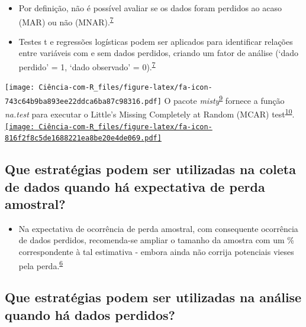 \documentclass[
]{book}
\providecommand{\tightlist}{%
  \setlength{\itemsep}{0pt}\setlength{\parskip}{0pt}}
\begin{document}
\begin{itemize}
\item
  Por definição, não é possível avaliar se os dados foram perdidos ao acaso (MAR) ou não (MNAR).\textsuperscript{\protect\hyperlink{ref-Heymans2022}{7}}
\item
  Testes t e regressões logísticas podem ser aplicados para identificar relações entre variáveis com e sem dados perdidos, criando um fator de análise (`dado perdido' = 1, `dado observado' = 0).\textsuperscript{\protect\hyperlink{ref-Heymans2022}{7}}
\end{itemize}

\texttt{[image: Ciência-com-R\_files/figure-latex/fa-icon-743c64b9ba893ee22ddca6ba87c98316.pdf]} O pacote \emph{misty}\textsuperscript{\protect\hyperlink{ref-misty}{9}} fornece a função \emph{na.test} para executar o Little's Missing Completely at Random (MCAR) test\textsuperscript{\protect\hyperlink{ref-little1988}{10}}. \href{https://cran.r-project.org/web/packages/misty/index.html}{\texttt{[image: Ciência-com-R\_files/figure-latex/fa-icon-816f2f8c5de1688221ea8be20e4de069.pdf]}}

\hypertarget{que-estratuxe9gias-podem-ser-utilizadas-na-coleta-de-dados-quando-huxe1-expectativa-de-perda-amostral}{%
\subsection{Que estratégias podem ser utilizadas na coleta de dados quando há expectativa de perda amostral?}\label{que-estratuxe9gias-podem-ser-utilizadas-na-coleta-de-dados-quando-huxe1-expectativa-de-perda-amostral}}

\begin{itemize}
\tightlist
\item
  Na expectativa de ocorrência de perda amostral, com consequente ocorrência de dados perdidos, recomenda-se ampliar o tamanho da amostra com um \% correspondente à tal estimativa - embora ainda não corrija potenciais vieses pela perda.\textsuperscript{\protect\hyperlink{ref-Altman2007}{6}}
\end{itemize}

\hypertarget{que-estratuxe9gias-podem-ser-utilizadas-na-anuxe1lise-quando-huxe1-dados-perdidos}{%
\subsection{Que estratégias podem ser utilizadas na análise quando há dados perdidos?}\label{que-estratuxe9gias-podem-ser-utilizadas-na-anuxe1lise-quando-huxe1-dados-perdidos}}
\end{document}
